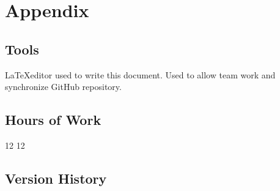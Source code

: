 \section{Appendix}
\subsection{Tools}
\begin{itemize}
	 \LaTeX editor used to write this document.
	 Used to allow team work and synchronize GitHub repository.
\end{itemize}
\subsection{Hours of Work}
\begin{itemize}
	 12
	 12
\end{itemize}
\subsection{Version History}
